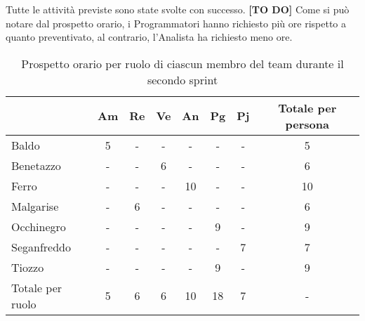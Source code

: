         \newblock
        \newpage

    Tutte le attività previste sono state svolte con successo. \textbf{[TO DO]}
    Come si può notare dal prospetto orario, i Programmatori hanno richiesto più ore rispetto a quanto preventivato, al contrario, l'Analista
    ha richiesto meno ore.
    \begin{table}[!h]
        \centering
        \begin{tabular}{ |l| c | c | c | c | c | c | c |} 
            \hline
            \textbf{} & \textbf{Am} & \textbf{Re} & \textbf{Ve} &\textbf{An} & \textbf{Pg} & \textbf{Pj} & \textbf{Totale per persona} \\
            \hline 
            Baldo       & 5 & - & - & - & - & - & 5   \\ 
            Benetazzo   & - & - & 6 & - & - & - & 6   \\ 
            Ferro       & - & - & - & 10 & - & - & 10   \\ 
            Malgarise   & - & 6 & - & - & - & - & 6   \\ 
            Occhinegro  & - & - & - & - & 9 & - & 9   \\ 
            Seganfreddo & - & - & - & - & - & 7 & 7   \\
            Tiozzo      & - & - & - & - & 9 & - & 9   \\ 
            \hline
            Totale per ruolo & 5 & 6 & 6 & 10 & 18 & 7 & - \\
            \hline
        \end{tabular}
        \caption{Prospetto orario per ruolo di ciascun membro del team durante il secondo sprint}
        \label{tab:6}
    \end{table}
    \newpage
